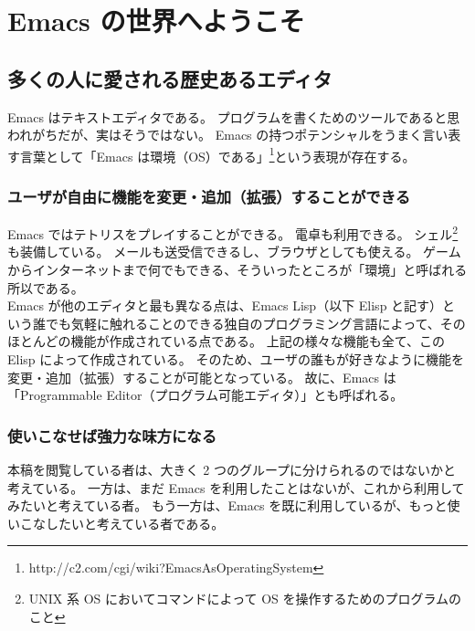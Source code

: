 \chapter{Emacs の世界へようこそ}
\section{多くの人に愛される歴史あるエディタ}
Emacs はテキストエディタである。
プログラムを書くためのツールであると思われがちだが、実はそうではない。
Emacs の持つポテンシャルをうまく言い表す言葉として「Emacs は環境（OS）である」\footnote{http://c2.com/cgi/wiki?EmacsAsOperatingSystem}という表現が存在する。
\subsection{ユーザが自由に機能を変更・追加（拡張）することができる}
Emacs ではテトリスをプレイすることができる。
電卓も利用できる。
シェル\footnote{UNIX 系 OS においてコマンドによって OS を操作するためのプログラムのこと}も装備している。
メールも送受信できるし、ブラウザとしても使える。
ゲームからインターネットまで何でもできる、そういったところが「環境」と呼ばれる所以である。\\

Emacs が他のエディタと最も異なる点は、Emacs Lisp（以下 Elisp と記す）という誰でも気軽に触れることのできる独自のプログラミング言語によって、そのほとんどの機能が作成されている点である。
上記の様々な機能も全て、この Elisp によって作成されている。
そのため、ユーザの誰もが好きなように機能を変更・追加（拡張）することが可能となっている。
故に、Emacs は「Programmable Editor（プログラム可能エディタ）」とも呼ばれる。
\subsection{使いこなせば強力な味方になる}
本稿を閲覧している者は、大きく 2 つのグループに分けられるのではないかと考えている。
一方は、まだ Emacs を利用したことはないが、これから利用してみたいと考えている者。
もう一方は、Emacs を既に利用しているが、もっと使いこなしたいと考えている者である。\\


